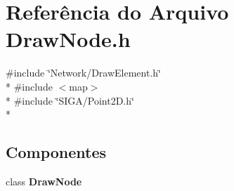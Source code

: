 \section{Referência do Arquivo Draw\+Node.\+h}
\label{_draw_node_8h}
{\ttfamily \#include \char`\"{}Network/\+Draw\+Element.\+h\char`\"{}}\\*
{\ttfamily \#include $<$map$>$}\\*
{\ttfamily \#include \char`\"{}S\+I\+G\+A/\+Point2\+D.\+h\char`\"{}}\\*
\subsection*{Componentes}
\begin{DoxyCompactItemize}
\item 
class {\bf Draw\+Node}
\end{DoxyCompactItemize}
